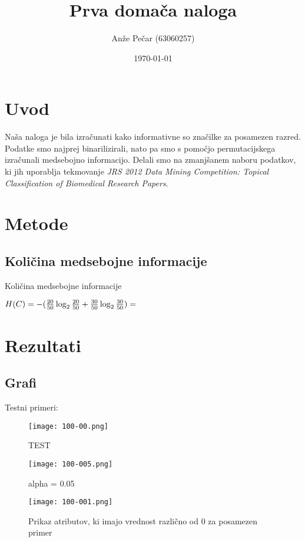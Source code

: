 \documentclass[a4paper,11pt]{article}
\title{Prva domača naloga}
\author{Anže Pečar (63060257)}
\date{\today}
\begin{document}
\maketitle

\section{Uvod}

Naša naloga je bila izračunati kako informativne so značilke za posamezen razred. Podatke smo najprej binarilizirali, nato pa smo s pomočjo permutacijskega izračunali medsebojno informacijo. Delali smo na zmanjšanem naboru podatkov, ki jih uporablja tekmovanje \textit{JRS 2012 Data Mining Competition: Topical Classification of Biomedical Research Papers}.

\section{Metode}
\subsection{Količina medsebojne informacije}
Količina medsebojne informacije 

$H(C) = -({20\over 50}\log_2{20\over50}+{30\over 50}\log_2{30\over50})=$
\section{Rezultati}
\subsection{Grafi}

Testni primeri:
\begin{figure}[H]
\begin{center}
\texttt{[image: 100-00.png]}
\caption{TEST}
\label{primeri2}
\end{center}
\end{figure}

\begin{figure}[H]
\begin{center}
\texttt{[image: 100-005.png]}
\caption{alpha = 0.05}
\label{primer3}
\end{center}
\end{figure}

\begin{figure}[H]
\begin{center}
\texttt{[image: 100-001.png]}
\caption{Prikaz atributov, ki imajo vrednost različno od 0 za posamezen primer}
\label{primeri4}
\end{center}
\end{figure}
\end{document}
